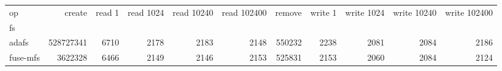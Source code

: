 \begin{tabular}{lrrrrrrrrrr}
\toprule
op &     create &  read 1 &  read 1024 &  read 10240 &  read 102400 &  remove &  write 1 &  write 1024 &  write 10240 &  write 102400 \\
fs       &            &         &            &             &              &         &          &             &              &               \\
\midrule
adafs    &  528727341 &    6710 &       2178 &        2183 &         2148 &  550232 &     2238 &        2081 &         2084 &          2186 \\
fuse-mfs &    3622328 &    6466 &       2149 &        2146 &         2153 &  525831 &     2153 &        2060 &         2084 &          2124 \\
\bottomrule
\end{tabular}
